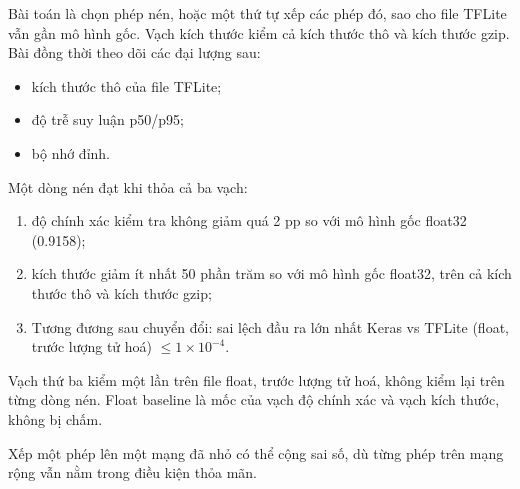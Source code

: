 \documentclass[13pt,a4paper]{article}
\begin{document}
Bài toán là chọn phép nén, hoặc một thứ tự xếp các phép đó, sao cho file TFLite vẫn gần mô hình gốc.
Vạch kích thước kiểm cả kích thước thô và kích thước gzip.
Bài đồng thời theo dõi các đại lượng sau:
\begin{itemize}[leftmargin=1.4em,itemsep=0.2em]
\item kích thước thô của file TFLite;
\item độ trễ suy luận p50/p95;
\item bộ nhớ đỉnh.
\end{itemize}
Một dòng nén đạt khi thỏa cả ba vạch:
\begin{enumerate}[leftmargin=1.4em,itemsep=0.2em]
\item độ chính xác kiểm tra không giảm quá 2 pp so với mô hình gốc float32 (0.9158);
\item kích thước giảm ít nhất 50 phần trăm so với mô hình gốc float32, trên cả kích thước thô và kích thước gzip;
\item Tương đương sau chuyển đổi: sai lệch đầu ra lớn nhất Keras vs TFLite (float, trước lượng tử hoá) \(\le 1\times 10^{-4}\).
\end{enumerate}
Vạch thứ ba kiểm một lần trên file float, trước lượng tử hoá, không kiểm lại trên từng dòng nén.
Float baseline là mốc của vạch độ chính xác và vạch kích thước, không bị chấm.


Xếp một phép lên một mạng đã nhỏ có thể cộng sai số, dù từng phép trên mạng rộng vẫn nằm trong điều kiện thỏa mãn.
\end{document}
